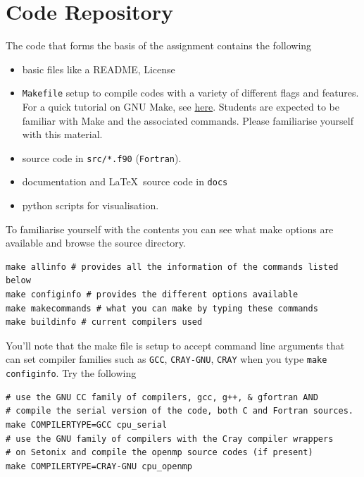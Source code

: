 \section{Code Repository}\label{sec:code}
The code that forms the basis of the assignment contains the following 
\begin{itemize}
	\item basic files like a README, License
	\item \texttt{Makefile} setup to compile codes with a variety of different flags and features. For a quick tutorial on GNU Make, see \href{https://www.gnu.org/software/make/}{here}. Students are expected to be familiar with Make and the associated commands. Please familiarise yourself with this material. 
	\item source code in \texttt{src/*.f90} (\texttt{Fortran}). 
	\item documentation and \LaTeX\ source code in \texttt{docs}
	\item python scripts for visualisation. 
\end{itemize}
To familiarise yourself with the contents you can see what make options are available and browse the source directory. 
\begin{center}
\begin{minipage}{0.95\textwidth}
\small
\begin{verbatim}
make allinfo # provides all the information of the commands listed below  
make configinfo # provides the different options available 
make makecommands # what you can make by typing these commands
make buildinfo # current compilers used
\end{verbatim}
\end{minipage}
\end{center}
You'll note that the make file is setup to accept command line arguments that can set compiler families such as \texttt{GCC}, \texttt{CRAY-GNU}, \texttt{CRAY} when you type \texttt{make configinfo}. Try the following
\begin{center}
\begin{minipage}{0.95\textwidth}
\small
\begin{verbatim}
# use the GNU CC family of compilers, gcc, g++, & gfortran AND 
# compile the serial version of the code, both C and Fortran sources.
make COMPILERTYPE=GCC cpu_serial 
# use the GNU family of compilers with the Cray compiler wrappers 
# on Setonix and compile the openmp source codes (if present)
make COMPILERTYPE=CRAY-GNU cpu_openmp 
\end{verbatim}
\end{minipage}
\end{center}


